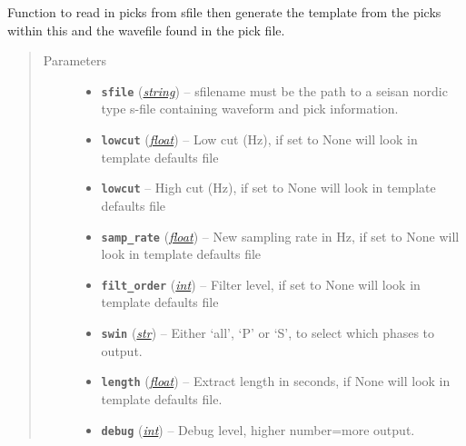 \documentclass[a4paper,10pt,english]{sphinxmanual}
\begin{document}
\begin{fulllineitems}
\label{core:template_gen.from_sfile}
Function to read in picks from sfile then generate the template from the
picks within this and the wavefile found in the pick file.
\begin{quote}\begin{description}
\item[{Parameters}] \leavevmode\begin{itemize}
\item {} 
\textbf{\texttt{sfile}} (\href{https://docs.python.org/library/string.html\#module-string}{\emph{string}}) -- sfilename must be the    path to a seisan nordic type s-file containing waveform and pick    information.

\item {} 
\textbf{\texttt{lowcut}} (\href{https://docs.python.org/library/functions.html\#float}{\emph{float}}) -- Low cut (Hz), if set to None will look in template            defaults file

\item {} 
\textbf{\texttt{lowcut}} -- High cut (Hz), if set to None will look in template            defaults file

\item {} 
\textbf{\texttt{samp\_rate}} (\href{https://docs.python.org/library/functions.html\#float}{\emph{float}}) -- New sampling rate in Hz, if set to None will look in            template defaults file

\item {} 
\textbf{\texttt{filt\_order}} (\href{https://docs.python.org/library/functions.html\#int}{\emph{int}}) -- Filter level, if set to None will look in            template defaults file

\item {} 
\textbf{\texttt{swin}} (\href{https://docs.python.org/library/functions.html\#str}{\emph{str}}) -- Either `all', `P' or `S', to select which phases to output.

\item {} 
\textbf{\texttt{length}} (\href{https://docs.python.org/library/functions.html\#float}{\emph{float}}) -- Extract length in seconds, if None will look in template            defaults file.

\item {} 
\textbf{\texttt{debug}} (\href{https://docs.python.org/library/functions.html\#int}{\emph{int}}) -- Debug level, higher number=more output.

\end{itemize}

\end{description}\end{quote}

\end{fulllineitems}
\end{document}
